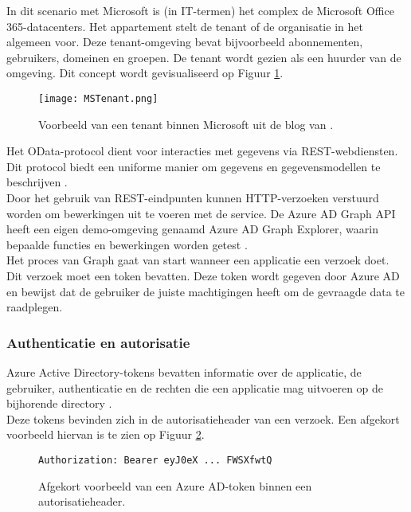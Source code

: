 In dit scenario met Microsoft is (in \ac{IT}-termen) het complex de Microsoft Office 365-datacenters. Het appartement stelt de tenant of de organisatie in het algemeen voor. Deze tenant-omgeving bevat bijvoorbeeld abonnementen, gebruikers, domeinen en groepen. De tenant wordt gezien als een huurder van de omgeving. Dit concept wordt gevisualiseerd op Figuur \ref{mst}. \\

\begin{figure}[!h]
    \texttt{[image: MSTenant.png]}
    \caption[Voorbeeld Microsoft tenant]{Voorbeeld van een tenant binnen Microsoft uit de blog van \textcite{Saxton2015}.}
    \label{mst}
\end{figure}

Het OData-protocol dient voor interacties met gegevens via \ac{REST}-webdiensten. Dit protocol biedt een uniforme manier om gegevens en gegevensmodellen te beschrijven \autocite{OData2023}. \\

Door het gebruik van \ac{REST}-eindpunten kunnen \ac{HTTP}-verzoeken verstuurd worden om bewerkingen uit te voeren met de service. De Azure \ac{AD} Graph \ac{API} heeft een eigen demo-omgeving genaamd Azure \ac{AD} Graph Explorer, waarin bepaalde functies en bewerkingen worden getest \autocite{Microsoft}. \\

Het proces van Graph gaat van start wanneer een applicatie een verzoek doet. Dit verzoek moet een token bevatten. Deze token wordt gegeven door Azure \ac{AD} en bewijst dat de gebruiker de juiste machtigingen heeft om de gevraagde data te raadplegen.

\subsubsection{Authenticatie en autorisatie}

Azure Active Directory-tokens bevatten informatie over de applicatie, de gebruiker, authenticatie en de rechten die een applicatie mag uitvoeren op de bijhorende directory \autocite{Microsoft2015}. \\

Deze tokens bevinden zich in de autorisatieheader van een verzoek.
Een afgekort voorbeeld hiervan is te zien op Figuur \ref{ahtoken}. \\

\begin{figure}[h]
    \begin{verbatim}Authorization: Bearer eyJ0eX ... FWSXfwtQ
    \end{verbatim}    
    \caption[Voorbeeld Azure AD-token]{Afgekort voorbeeld van een Azure \Ac{AD}-token binnen een autorisatieheader.}
    \label{ahtoken}
\end{figure}

